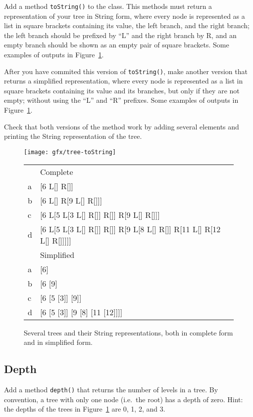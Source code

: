 \documentclass{article}
\begin{document}
Add a method \verb+toString()+ to the class. This methods must return
a representation of your tree in String form, where every node is
represented as a list in square brackets containing its value, the
left branch, and the right branch; the left branch should be prefixed
by ``L'' and the right branch by R, and an empty branch should be
shown as an empty pair of square brackets. 
Some examples of outputs in Figure~\ref{fig:jdjfj}.

After you have commited this version of \verb+toString()+, make
another version that returns a simplified representation, where every
node is represented as a list in square brackets containing its value
and its branches, but only if they are not empty; without using the
``L'' and ``R'' prefixes. 
Some examples of outputs in Figure~\ref{fig:jdjfj}.

Check that both versions of the method work by adding several elements
and printing the String representation of the tree. 

\begin{figure}[hbtp]
  \centering
  \texttt{[image: gfx/tree-toString]}
  \begin{tabular}{ll}
      & Complete \\
    a & [6 L[] R[]] \\
    b & [6 L[] R[9 L[] R[]]] \\
    c & [6 L[5 L[3 L[] R[]] R[]] R[9 L[] R[]]] \\
    d & [6 L[5 L[3 L[] R[]] R[]] R[9 L[8 L[] R[]] R[11 L[] R[12 L[] R[]]]]] \\
      & Simplified \\
    a & [6] \\
    b & [6 [9] \\
    c & [6 [5 [3]] [9]] \\
    d & [6 [5 [3]] [9 [8] [11 [12]]]] \\
  \end{tabular}
  \caption{Several trees and their String representations, both in
    complete form and in simplified form.}
  \label{fig:jdjfj}
\end{figure}

\subsection{Depth}
\label{sec:depth}

Add a method \verb+depth()+ that returns the number of levels in a
tree. By convention, a tree with only one node (i.e.~the root) has a
depth of zero. Hint: the depths of the trees in Figure~\ref{fig:jdjfj}
are 0, 1, 2, and 3. 
\end{document}
